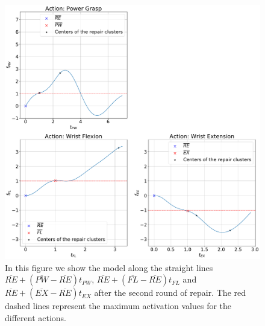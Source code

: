 \begin{figure}[H]
    \centering
    \includegraphics[width=\textwidth]{Images/repair-example/SMT-State2.pdf}
    \caption{In this figure we show the model along the straight lines $\overline{RE} + (\overline{PW} - \overline{RE})t_{PW}$, $\overline{RE} + (\overline{FL} - \overline{RE})t_{FL}$ and $\overline{RE} + (\overline{EX} - \overline{RE})t_{EX}$ after the second round of repair. The red dashed lines represent the maximum activation values for the different actions.}
    \label{fig:SMT-exec-2}
\end{figure}
